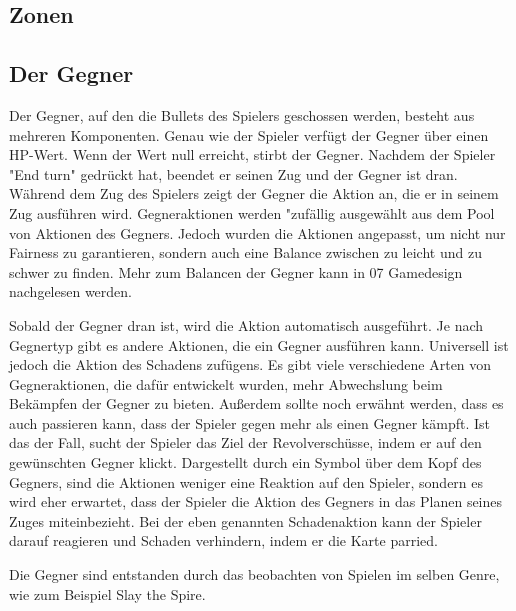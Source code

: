 

\subsection{Zonen}\label{backpack_and_deck}

\subsection{Der Gegner}\label{der_gegner}
Der Gegner, auf den die Bullets des Spielers geschossen werden, besteht aus mehreren Komponenten.
Genau wie der Spieler verfügt der Gegner über einen HP-Wert. Wenn der Wert null erreicht, stirbt der Gegner.
Nachdem der Spieler "End turn" gedrückt hat, beendet er seinen Zug und der Gegner ist dran. Während dem Zug des Spielers
zeigt der Gegner die Aktion an, die er in seinem Zug ausführen wird.
Gegneraktionen werden "zufällig ausgewählt aus dem Pool von Aktionen des Gegners.
Jedoch wurden die Aktionen angepasst, um nicht nur Fairness zu garantieren,
sondern auch eine Balance zwischen zu leicht und zu schwer zu finden.
Mehr zum Balancen der Gegner kann in 07 Gamedesign nachgelesen werden.


Sobald der Gegner dran ist, wird die Aktion automatisch ausgeführt. Je nach Gegnertyp gibt es andere Aktionen,
die ein Gegner ausführen kann. Universell ist jedoch die Aktion des Schadens zufügens.
Es gibt viele verschiedene Arten von Gegneraktionen, die dafür entwickelt wurden, mehr Abwechslung beim Bekämpfen der Gegner zu bieten.
Außerdem sollte noch erwähnt werden, dass es auch passieren kann, dass der Spieler gegen mehr als einen Gegner kämpft.
Ist das der Fall, sucht der Spieler das Ziel der Revolverschüsse, indem er auf den gewünschten Gegner klickt.
Dargestellt durch ein Symbol über dem Kopf des Gegners, sind die Aktionen weniger eine Reaktion auf den Spieler,
sondern es wird eher erwartet, dass der Spieler die Aktion des Gegners in das Planen seines Zuges miteinbezieht.
Bei der eben genannten Schadenaktion kann der Spieler darauf reagieren und Schaden verhindern, indem er die Karte parried.

Die Gegner sind entstanden durch das beobachten von Spielen im selben Genre, wie zum Beispiel Slay the Spire. \cite{slaythespire}

